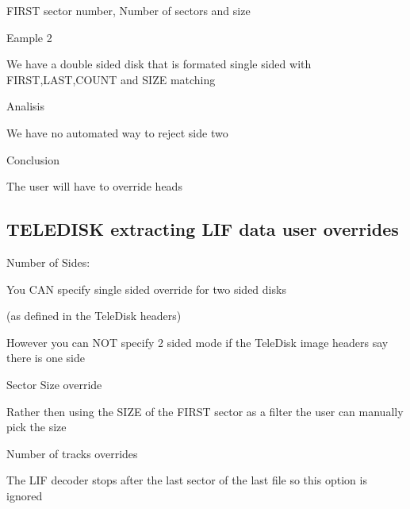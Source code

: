 \begin{DoxyItemize}
\begin{DoxyItemize}
\begin{DoxyItemize}
\item F\+I\+R\+ST sector number, Number of sectors and size
\end{DoxyItemize}
\end{DoxyItemize}
\item Eample 2
\begin{DoxyItemize}
\item We have a double sided disk that is formated single sided with F\+I\+R\+ST,L\+A\+ST,C\+O\+U\+NT and S\+I\+ZE matching
\end{DoxyItemize}
\item Analisis
\begin{DoxyItemize}
\item We have no automated way to reject side two
\end{DoxyItemize}
\item Conclusion
\begin{DoxyItemize}
\item The user will have to override heads 


\end{DoxyItemize}
\end{DoxyItemize}

\subsection*{T\+E\+L\+E\+D\+I\+SK extracting L\+IF data user overrides}


\begin{DoxyItemize}
\item Number of Sides\+:
\begin{DoxyItemize}
\item You C\+AN specify single sided override for two sided disks
\begin{DoxyItemize}
\item (as defined in the Tele\+Disk headers)
\end{DoxyItemize}
\item However you can N\+OT specify 2 sided mode if the Tele\+Disk image headers say there is one side
\end{DoxyItemize}
\item Sector Size override
\begin{DoxyItemize}
\item Rather then using the S\+I\+ZE of the F\+I\+R\+ST sector as a filter the user can manually pick the size
\end{DoxyItemize}
\item Number of tracks overrides
\begin{DoxyItemize}
\item The L\+IF decoder stops after the last sector of the last file so this option is ignored 
\end{DoxyItemize}
\end{DoxyItemize}





